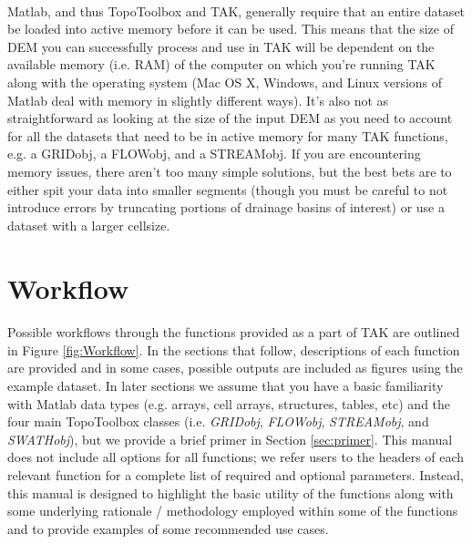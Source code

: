\paragraph{}Matlab, and thus TopoToolbox and TAK, generally require that an entire dataset be loaded into active memory before it can be used. This means that the size of DEM you can successfully process and use in TAK will be dependent on the available memory (i.e. RAM) of the computer on which you're running TAK along with the operating system (Mac OS X, Windows, and Linux versions of Matlab deal with memory in slightly different ways). It's also not as straightforward as looking at the size of the input DEM as you need to account for all the datasets that need to be in active memory for many TAK functions, e.g. a GRIDobj, a FLOWobj, and a STREAMobj. If you are encountering memory issues, there aren't too many simple solutions, but the best bets are to either spit your data into smaller segments (though you must be careful to not introduce errors by truncating portions of drainage basins of interest) or use a dataset with a larger cellsize. 

\section{Workflow} \label{sec:workflow}

\paragraph{}Possible workflows through the functions provided as a part of TAK are outlined in Figure \ref{fig:Workflow}. In the sections that follow, descriptions of each function are provided and in some cases, possible outputs are included as figures using the example dataset. In later sections we assume that you have a basic familiarity with Matlab data types (e.g. arrays, cell arrays, structures, tables, etc) and the four main TopoToolbox classes (i.e. \textit{GRIDobj}, \textit{FLOWobj}, \textit{STREAMobj}, and \textit{SWATHobj}), but we provide a brief primer in Section \ref{sec:primer}. This manual does not include all options for all functions; we refer users to the headers of each relevant function for a complete list of required and optional parameters. Instead, this manual is designed to highlight the basic utility of the functions along with some underlying rationale / methodology employed within some of the functions and to provide examples of some recommended use cases.

